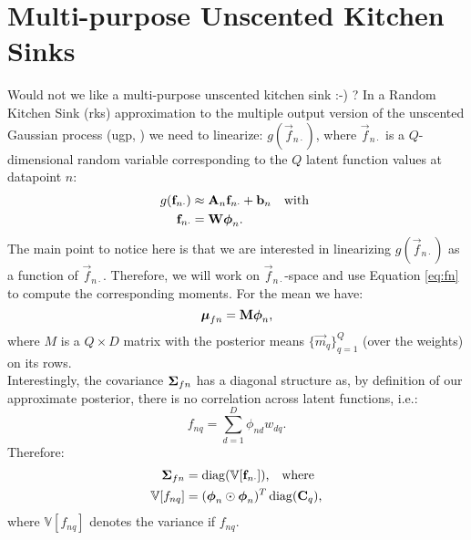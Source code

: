 \documentclass[11pt,a4paper]{article}
\newcommand{\rks}{{\sc rks}\xspace}
\newcommand{\ugp}{{\sc ugp}\xspace}
\newcommand{\m}{\vec{m}}
\renewcommand{\Q}{Q}
\newcommand{\f}{\vec{f}}
\newcommand{\fn}{\f_{n \cdot}}
\newcommand{\An}{\mat{A}_n}
\newcommand{\bn}{\vec{b}_n}
\renewcommand{\W}{\mat{W}}
\newcommand{\phin}{\vecS{\phi}_n}
\newcommand{\mufn}{\vecS{\mu}_{fn}}
\newcommand{\Sigmafn}{\mat{\Sigma}_{fn}}
\newcommand{\M}{\mat{M}}
\renewcommand{\D}{D}
\newcommand{\fnq}{f_{nq}}
\newcommand{\var}[1]{\mathbb{V}[#1]}
\begin{document}
%
\section{Multi-purpose Unscented Kitchen Sinks}
Would not we like a multi-purpose unscented kitchen sink :-) ? In a Random Kitchen Sink (\rks)
approximation to the multiple output version of the unscented Gaussian process (\ugp, ) we need to linearize: $g(\fn)$, where $\fn$ is a $\Q$-dimensional random variable corresponding to the $\Q$ latent function values at datapoint $n$:
\begin{align}
	g(\fn) & \approx \An \fn + \bn \quad \text{with }\\
	\label{eq:fn}
\fn &=  \W \phin \text{.}
\end{align}
The main point to notice here is that we are interested in linearizing $g(\fn)$ as a function of $\fn$. 
Therefore, we will work on $\fn$-space and use Equation \eqref{eq:fn} to compute the corresponding
moments. For the mean we have:
\begin{equation}
	\mufn = \M \phin \text{,}
\end{equation}
where $M$ is a $\Q \times \D$  matrix with the posterior means $\{ \m_q\}_{q=1}^{Q}$ (over 
the weights) on its rows. \\

Interestingly, the covariance $\Sigmafn$ has a diagonal structure as, by definition of our 
approximate posterior, there is no correlation across latent functions, i.e.:
\begin{equation}
	\fnq = \sum_{d=1}^{\D} \phi_{nd} w_{dq} \text{.}
\end{equation}
Therefore:
\begin{align}
	\label{eq:Sigmafn}
	\Sigmafn &= \diag(\var{\fn}) \text{,} \quad \text{where } \\
	\label{eq:var-fnq}
	\var{\fnq} & = (\phin \hada \phin)^T \diag(\C_q)  \text{,}
\end{align}
where $\var{\fnq}$ denotes the variance if $\fnq$. \\
\end{document}
